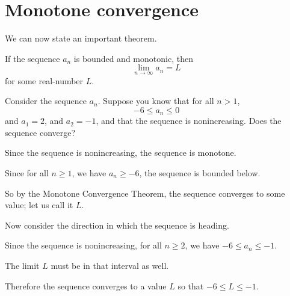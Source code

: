 \documentclass{ximera}
\begin{document}
\section{Monotone convergence}

We can now state an important theorem.

\begin{theorem}
  If the sequence $a_n$ is bounded and monotonic, then
  \[
  \lim_{n \to  \infty} a_n = L
  \]
  for some real-number $L$.
\end{theorem}
\begin{question}
  Consider the sequence $a_{n}$.  Suppose you know that for all $n >
  1$,
  \[
  -6 \le a_{n} \le 0
  \]
  and $a_{1} = 2$, and $a_{2} = -1$, and that the sequence is
  nonincreasing.  Does the sequence converge?
  \begin{hint}
    Since the sequence is nonincreasing, the sequence is monotone.
  \end{hint}
  \begin{hint}
    Since for all $n \ge 1$, we have $a_{n} \ge -6$, the sequence is
    bounded below.
  \end{hint}
  \begin{hint}
    So by the Monotone Convergence Theorem, the sequence converges to
    some value; let us call it $L$.
  \end{hint}
  \begin{hint}
    Now consider the direction in which the sequence is heading.
  \end{hint}
  \begin{hint}
    Since the sequence is nonincreasing, for all $n \ge 2$, we have
    $-6 \le a_{n} \le -1$.
  \end{hint}
  \begin{hint}
    The limit $L$ must be in that interval as well.
  \end{hint}
  \begin{hint}
    Therefore the sequence converges to a value $L$ so that $-6 \le L
    \le -1$.
  \end{hint}
  \begin{prompt}
  \begin{multipleChoice}
  \end{multipleChoice}
  \end{prompt}
\end{question}
\end{document}
